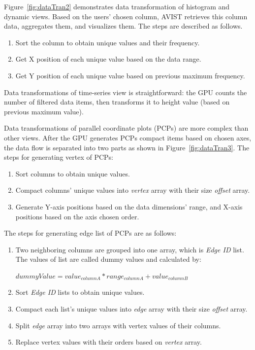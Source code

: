 Figure~\ref{fig:dataTran2} demonstrates data transformation of histogram and dynamic views. Based on the users' chosen column, AVIST retrieves this column data,  aggregates them, and visualizes them. The steps are described as follows. 
\begin{enumerate}[noitemsep]
	\item Sort the  column to obtain unique values and their frequency.
	\item Get X position of each unique value based on the data range.
	\item Get Y position of each unique value based on previous maximum frequency.
\end{enumerate}	

Data transformations of  time-series view is straightforward: the GPU counts the number of  filtered data items, then transforms it to height value (based on previous maximum value). 

Data transformations of parallel coordinate plots (PCPs) are more complex than other views. After the GPU generates PCPs compact items based on chosen axes, the data flow is separated into two parts as shown in Figure~\ref{fig:dataTran3}. The steps for generating vertex of PCPs:
\begin{enumerate}[noitemsep]
	\item  Sort  columns to obtain unique values.
	\item Compact  columns' unique values into \textit{vertex} array with their size \textit{offset} array.
	\item Generate Y-axis positions based on the data dimensions' range, and X-axis positions based on the axis chosen order. 
\end{enumerate}

The steps for generating edge list of PCPs are as follows:
\begin{enumerate}[noitemsep]
	\item Two neighboring columns are grouped into one array, which is \textit{Edge ID} list. The values of list are called dummy values and calculated by: 
	
	$dummyValue = value_{columnA}*range_{columnA} + value_{columnB}$
	
	\item  Sort \textit{Edge ID} lists to obtain unique values.
	\item Compact each list's unique values into \textit{edge} array with their size \textit{offset} array.
	\item Split \textit{edge} array into two arrays with vertex values of their columns.
	\item Replace vertex values with their orders based on \textit{vertex} array.
	
\end{enumerate}

